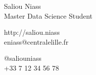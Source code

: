 \documentclass{article}
\begin{document}
\parbox{2in}{\Large \centering Saliou Niass\\[1pt]
\normalsize Master Data Science Student}

\vfill
\raggedright
\begin{multicols}{2}
http://saliou.niass\\
eniass@centralelille.fr

\columnbreak
\raggedleft
@saliouniass\\
+33 7 12 34 56 78%
\end{multicols}%
\end{document}
